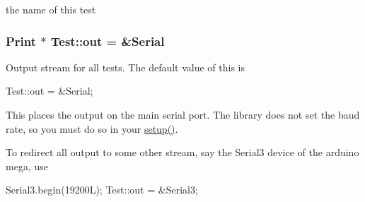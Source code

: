the name of this test \hypertarget{class_test_a33e59751992ec1a8a65745c0b6b144b0}{
\subsubsection[{out}]{\setlength{\rightskip}{0pt plus 5cm}Print $\ast$ Test\-::out = \&Serial\hspace{0.3cm}{\ttfamily [static]}}}\label{class_test_a33e59751992ec1a8a65745c0b6b144b0}
Output stream for all tests. The default value of this is \begin{DoxyVerb}Test::out = &Serial;
\end{DoxyVerb}


This places the output on the main serial port. The library does not set the baud rate, so you must do so in your \hyperlink{class_test_a5eed880dda5138db9b40c6a8c3e6b3c3}{setup()}.

To redirect all output to some other stream, say the Serial3 device of the arduino mega, use \begin{DoxyVerb}Serial3.begin(19200L);
Test::out = &Serial3;
\end{DoxyVerb}


